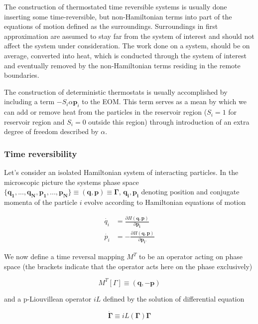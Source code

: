 \documentclass[a4paper,12pt]{article}
\begin{document}
The construction of thermostated time reversible systems is usually done inserting some time-reversible, but non-Hamiltonian terms into part of the equations of motion defined as the surroundings. Surroundings in first approximation are assumed to stay far from the system of interest and should not affect the system under consideration.
The work done on a system, should be on average, converted into heat, which is conducted through the system of interest and eventually removed by the non-Hamiltonian terms residing in the remote boundaries.

The construction of deterministic thermostats is usually accomplished by including a term $- S_i \alpha \bm{p}_i $ to the EOM. 
This term serves as a mean by which we can add or remove heat from the particles in the reservoir region ($S_i =1$ for reservoir region and $S_i = 0$ outside this region) through introduction of an extra degree of freedom described by $\alpha$.

\subsubsection{Time reversibility}
Let's consider an isolated Hamiltonian system of interacting particles.
In the microscopic picture the systems phase space $\{\bm{q_1},...,\bm{q_N},\bm{p_1},...,\bm{p_N} \} \equiv (\bm{q},\bm{p})\equiv \bm{\Gamma} $, $\bm{q_i}, \bm{p_i} $ denoting position and conjugate momenta of the particle $i$ evolve according to Hamiltonian equations of motion

\begin{equation}
\begin{aligned}
  \dot{q_i} &=\frac{\partial H(\bm{q},\bm{p})}{\partial{\bm{p_i}}} \\
  \dot{p_i} &=- \frac{\partial H(\bm{q},\bm{p})}{\partial{\bm{p_i}}.}
\end{aligned}
\end{equation}

We now define a time reversal mapping $M^T$ to be an operator acting on phase space (the brackets indicate that the operator acts here on the phase exclusively) 

\begin{equation}
  M^T[ \Gamma] \equiv (\bm{q},-\bm{p})
\end{equation}

and a p-Liouvillean operator $iL$ defined by the solution of differential equation 

\begin{equation}
 \dot{\bm{\Gamma}} \equiv iL(\bm{\Gamma})\bm{\Gamma}
\end{equation}
\end{document}
